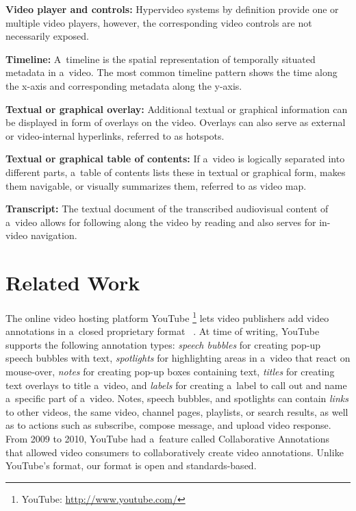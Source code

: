 \documentclass{sig-alternate}
\newcommand{\inlinelistingsize}{\fontsize{8pt}{11pt}}
\let\oldurl\url
\renewcommand{\url}[1]{\inlinelistingsize\oldurl{#1}}
\begin{document}
\noindent \textbf{Video player and controls:} Hypervideo systems by definition
  provide one or multiple video players, however,
  the corresponding video controls are not necessarily exposed.

\noindent \textbf{Timeline:} A~timeline is the spatial representation
  of temporally situated metadata in a~video.
  The most common timeline pattern shows the
  time along the x-axis and corresponding metadata along the y-axis.

\noindent \textbf{Textual or graphical overlay:}
  Additional textual or gra\-phical
  information can be displayed in form of overlays on the video.
  Overlays can also serve as external or video-internal hyperlinks,
  referred to as hotspots.

\noindent \textbf{Textual or graphical table of contents:}
  If a~video is logically separated
  into different parts, a~table of contents lists these
  in textual or graphical form, makes them navigable,
  or visually summarizes them, referred to as video map.

\noindent \textbf{Transcript:} The textual document
  of the transcribed audiovisual content of a~video
  allows for following along the video by reading
  and also serves for in-video navigation.

\section{Related Work}

The online video hosting platform YouTube%
\footnote{YouTube: \url{http://www.youtube.com/}}
lets video publishers add video annotations
in a~closed proprietary format%
~\cite{youtube2010annotations}.
At time of writing, YouTube supports the following
annotation types: \emph{speech bubbles} for creating
pop-up speech bubbles with text,
\emph{spotlights} for highlighting areas in a~video
that react on mouse-over,
\emph{notes} for creating pop-up boxes containing text,
\emph{titles} for creating text overlays to title a~video,
and \emph{labels} for creating a~label to call out
and name a~specific part of a~video.
Notes, speech bubbles, and spotlights can contain \emph{links}
to other videos, the same video, channel pages, playlists,
or search results, as well as to actions
such as subscribe, compose message, and upload video response.
From 2009 to 2010, YouTube had a~feature called
Collaborative Annotations%
~\cite{fink2009collaborativeannotations}
that allowed video consumers to collaboratively
create video annotations.
Unlike YouTube's format, our format is open and standards-based.
\end{document}
